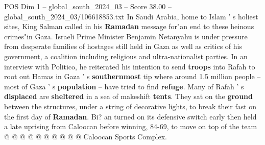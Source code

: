 \begin{textsample}{POS Dim 1 – global\_south\_2024\_03 – Score 38.00 – global\_south\_2024\_03/106618853.txt}
In Saudi Arabia, home to Islam ' s holiest sites, King Salman called in his \textbf{Ramadan} message for"an end to these heinous crimes"in Gaza.
Israeli Prime Minister Benjamin Netanyahu is under pressure from desperate families of hostages still held in Gaza as well as critics of his government, a coalition including religious and ultra-nationalist parties.
In an interview with Politico, he reiterated his intention to send \textbf{troops} into Rafah to root out Hamas in Gaza ' s \textbf{southernmost} tip where around 1.5 million people -- most of Gaza ' s \textbf{population} -- have tried to find \textbf{refuge}.
Many of Rafah ' s \textbf{displaced} are \textbf{sheltered} in a sea of makeshift \textbf{tents}.
They sat on the \textbf{ground} between the structures, under a string of decorative lights, to break their fast on the first day of \textbf{Ramadan}.
Bi? an turned on its defensive switch early then held a late uprising from Caloocan before winning, 84-69, to move on top of the team @ @ @ @ @ @ @ @ @ @ Caloocan Sports Complex.

\end{textsample}
